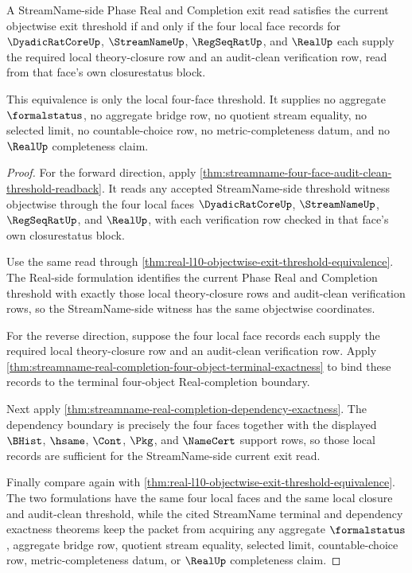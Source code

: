 \begin{theorem}
\label{thm:streamname-real-completion-objectwise-threshold-equivalence}
A StreamName-side Phase Real and Completion exit read satisfies the current objectwise exit threshold if and only if the four local face records for $\DyadicRatCoreUp$, $\StreamNameUp$, $\RegSeqRatUp$, and $\RealUp$ each supply the required local theory-closure row and an audit-clean verification row, read from that face's own closurestatus block.

This equivalence is only the local four-face threshold. It supplies no aggregate $\formalstatus$, no aggregate bridge row, no quotient stream equality, no selected limit, no countable-choice row, no metric-completeness datum, and no $\RealUp$ completeness claim.
\end{theorem}
\begin{proof}
For the forward direction, apply \autoref{thm:streamname-four-face-audit-clean-threshold-readback}. It reads any accepted StreamName-side threshold witness objectwise through the four local faces $\DyadicRatCoreUp$, $\StreamNameUp$, $\RegSeqRatUp$, and $\RealUp$, with each verification row checked in that face's own closurestatus block.

Use the same read through \autoref{thm:real-l10-objectwise-exit-threshold-equivalence}. The Real-side formulation identifies the current Phase Real and Completion threshold with exactly those local theory-closure rows and audit-clean verification rows, so the StreamName-side witness has the same objectwise coordinates.

For the reverse direction, suppose the four local face records each supply the required local theory-closure row and an audit-clean verification row. Apply \autoref{thm:streamname-real-completion-four-object-terminal-exactness} to bind these records to the terminal four-object Real-completion boundary.

Next apply \autoref{thm:streamname-real-completion-dependency-exactness}. The dependency boundary is precisely the four faces together with the displayed $\BHist$, $\hsame$, $\Cont$, $\Pkg$, and $\NameCert$ support rows, so those local records are sufficient for the StreamName-side current exit read.

Finally compare again with \autoref{thm:real-l10-objectwise-exit-threshold-equivalence}. The two formulations have the same four local faces and the same local closure and audit-clean threshold, while the cited StreamName terminal and dependency exactness theorems keep the packet from acquiring any aggregate $\formalstatus$, aggregate bridge row, quotient stream equality, selected limit, countable-choice row, metric-completeness datum, or $\RealUp$ completeness claim.
\end{proof}

